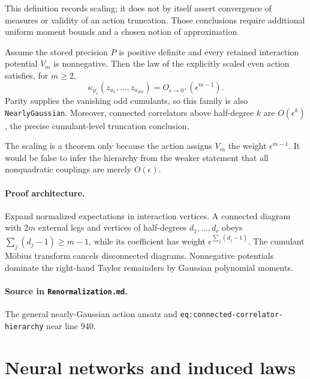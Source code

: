 This definition records scaling; it does not by itself assert convergence of measures or validity
of an action truncation.  Those conclusions require additional uniform moment bounds and a chosen
notion of approximation.

\begin{theorem}
\label{thm:renorm:connectedCorrelatorHierarchy}
Assume the stored precision $P$ is positive definite and every retained interaction potential
$V_m$ is nonnegative.  Then the law of the explicitly scaled even action satisfies, for $m\geq2$,
\[
 \kappa_{\mu_\epsilon}(z_{a_1},\ldots,z_{a_{2m}})
 =O_{\epsilon\to0^+}(\epsilon^{m-1}).
\]
Parity supplies the vanishing odd cumulants, so this family is also \texttt{NearlyGaussian}.
Moreover, connected correlators above half-degree $k$ are $O(\epsilon^k)$, the precise
cumulant-level truncation conclusion.

The scaling is a theorem only because the action assigns $V_m$ the weight
$\epsilon^{m-1}$.  It would be false to infer the hierarchy from the weaker statement that all
nonquadratic couplings are merely $O(\epsilon)$.

\paragraph{Proof architecture.}
Expand normalized expectations in interaction vertices.  A connected diagram with $2m$ external
legs and vertices of half-degrees $d_1,\ldots,d_r$ obeys
$\sum_j(d_j-1)\geq m-1$, while its coefficient has weight
$\epsilon^{\sum_j(d_j-1)}$.  The cumulant Möbius transform cancels disconnected diagrams.
Nonnegative potentials dominate the right-hand Taylor remainders by Gaussian polynomial moments.

\paragraph{Source in \texttt{Renormalization.md}.}
The general nearly-Gaussian action ansatz and
\texttt{eq:connected-correlator-hierarchy} near line 940.
\end{theorem}

\section{Neural networks and induced laws}
\label{sec:renorm:neuralNetworks}

